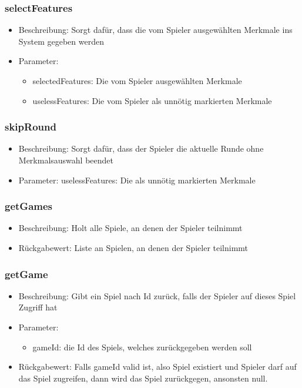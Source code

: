 \documentclass[a4paper]{scrreprt}
\begin{document}
	\subsubsection{selectFeatures}
	\begin{itemize}
		\item Beschreibung: Sorgt dafür, dass die vom Spieler ausgewählten Merkmale ins System gegeben werden
		\item Parameter: 
		\begin{itemize}
		\item selectedFeatures: Die vom Spieler ausgewählten Merkmale
		\item uselessFeatures: Die vom Spieler als unnötig markierten Merkmale
		\end{itemize}
	\end{itemize}
	\subsubsection{skipRound}
	\begin{itemize}
	\item Beschreibung: Sorgt dafür, dass der Spieler die aktuelle Runde ohne Merkmalsauswahl beendet
	\item Parameter: uselessFeatures: Die als unnötig markierten Merkmale
	\end{itemize}
	\subsubsection{getGames}
	\begin{itemize}
		\item Beschreibung: Holt alle Spiele, an denen der Spieler teilnimmt
		\item Rückgabewert: Liste an Spielen, an denen der Spieler teilnimmt
	\end{itemize}
	\subsubsection{getGame}
	\begin{itemize}
		\item Beschreibung: Gibt ein Spiel nach Id zurück, falls der Spieler auf dieses Spiel Zugriff hat
		\item Parameter:
		\begin{itemize}
			\item gameId: die Id des Spiels, welches zurückgegeben werden soll
		\end{itemize}
		\item Rückgabewert: Falls gameId valid ist, also Spiel existiert und Spieler darf auf das Spiel zugreifen, dann wird das Spiel zurückgegen, ansonsten null.
	\end{itemize}
\end{document}
